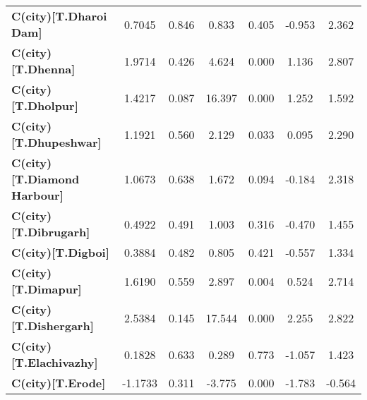 \begin{center}
\begin{tabular}{lcccccc}
\textbf{C(city)[T.Dharoi Dam]}                                                                      &       0.7045  &        0.846     &     0.833  &         0.405        &       -0.953    &        2.362     \\
\textbf{C(city)[T.Dhenna]}                                                                          &       1.9714  &        0.426     &     4.624  &         0.000        &        1.136    &        2.807     \\
\textbf{C(city)[T.Dholpur]}                                                                         &       1.4217  &        0.087     &    16.397  &         0.000        &        1.252    &        1.592     \\
\textbf{C(city)[T.Dhupeshwar]}                                                                      &       1.1921  &        0.560     &     2.129  &         0.033        &        0.095    &        2.290     \\
\textbf{C(city)[T.Diamond Harbour]}                                                                 &       1.0673  &        0.638     &     1.672  &         0.094        &       -0.184    &        2.318     \\
\textbf{C(city)[T.Dibrugarh]}                                                                       &       0.4922  &        0.491     &     1.003  &         0.316        &       -0.470    &        1.455     \\
\textbf{C(city)[T.Digboi]}                                                                          &       0.3884  &        0.482     &     0.805  &         0.421        &       -0.557    &        1.334     \\
\textbf{C(city)[T.Dimapur]}                                                                         &       1.6190  &        0.559     &     2.897  &         0.004        &        0.524    &        2.714     \\
\textbf{C(city)[T.Dishergarh]}                                                                      &       2.5384  &        0.145     &    17.544  &         0.000        &        2.255    &        2.822     \\
\textbf{C(city)[T.Elachivazhy]}                                                                     &       0.1828  &        0.633     &     0.289  &         0.773        &       -1.057    &        1.423     \\
\textbf{C(city)[T.Erode]}                                                                           &      -1.1733  &        0.311     &    -3.775  &         0.000        &       -1.783    &       -0.564     \\

\end{tabular}
\end{center}
